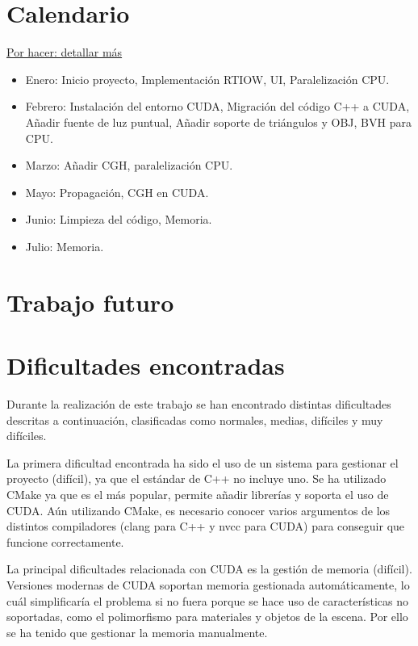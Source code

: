 \documentclass[10pt, a4paper]{article}
\begin{document}
\section{Calendario}

\underline{Por hacer: detallar más}

\begin{itemize}
    \item Enero: Inicio proyecto, Implementación RTIOW, UI, Paralelización CPU.
    
    \item Febrero: Instalación del entorno CUDA, Migración del código C++ a CUDA, Añadir fuente de luz puntual, Añadir soporte de triángulos y OBJ, BVH para CPU.
    
    \item Marzo: Añadir CGH, paralelización CPU.

    \item Mayo: Propagación, CGH en CUDA.

    \item Junio: Limpieza del código, Memoria.

    \item Julio: Memoria.
    
\end{itemize}

\section{Trabajo futuro}

\section{Dificultades encontradas}

Durante la realización de este trabajo se han encontrado distintas dificultades descritas a continuación, clasificadas como normales, medias, difíciles y muy difíciles.

La primera dificultad encontrada ha sido el uso de un sistema para gestionar el proyecto (difícil), ya que el estándar de C++ no incluye uno. Se ha utilizado CMake ya que es el más popular, permite añadir librerías y soporta el uso de CUDA. Aún utilizando CMake, es necesario conocer varios argumentos de los distintos compiladores (clang para C++ y nvcc para CUDA) para conseguir que funcione correctamente. 

La principal dificultades relacionada con CUDA es la gestión de memoria (difícil). Versiones modernas de CUDA soportan memoria gestionada automáticamente, lo cuál simplificaría el problema si no fuera porque se hace uso de características no soportadas, como el polimorfismo para materiales y objetos de la escena. Por ello se ha tenido que gestionar la memoria manualmente. 
\end{document}
